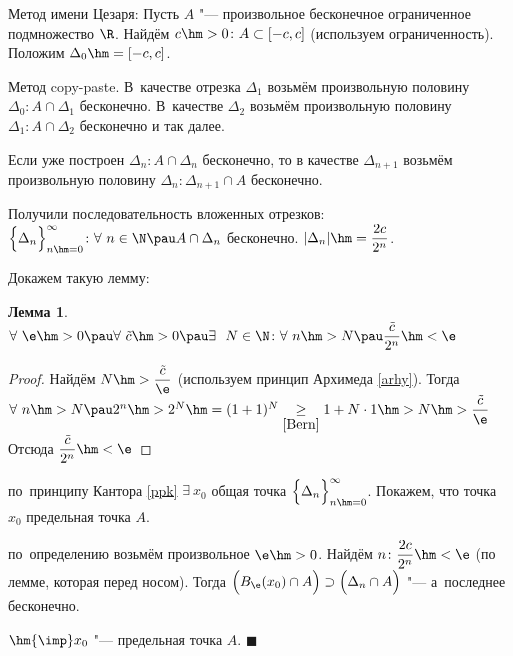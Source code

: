 \documentclass[a4paper,10pt,twoside]{article}
\newtheorem{Th}{Лемма}[section]
\newenvironment{Proof}
       {\par\noindent{\textbf{Доказательство.}}}
       {\hfill$\scriptstyle\blacksquare$}
\begin{document}
\begin{Proof}
    Метод имени Цезаря: Пусть $A$ "--- произвольное бесконечное ограниченное подмножество $\R$. Найдём $c\hm>0\colon A\subset[-c,c]$ (используем ограниченность).
    Положим $\Delta_0\hm=[-c,c]$.

    Метод copy-paste. В~качестве отрезка $\Delta_1$ возьмём произвольную половину $\Delta_0\colon A\cap \Delta_1$ бесконечно. В~качестве $\Delta_2$ возьмём произвольную половину $\Delta_1\colon A\cap\Delta_2$ бесконечно и так далее.

    Если уже построен $\Delta_n\colon A\cap \Delta_n$ бесконечно, то в
    качестве $\Delta_{n+1}$ возьмём произвольную половину $\Delta_n\colon \Delta_{n+1}\cap A$ бесконечно.

    Получили последовательность вложенных отрезков: $\Big\{\Delta_n\Big\}_{n\hm=0}^{\infty}\colon \forall\  n\in \N\pau A\cap\Delta_n$ бесконечно. $|\Delta_n|\hm=\dfrac{2c}{2^n}$.

    Докажем такую лемму:

    \begin{Th}\label{perednosom}
        $\forall\ \e\hm>0\pau \forall\  \tilde c\hm>0\pau \exists\ \ N\in\N\colon \forall\  n\hm>N\pau \dfrac{\tilde c}{2^n}\hm<\e$
    \end{Th}

    \begin{proof}
        Найдём $N\hm>\dfrac{\tilde c}{\e}$ (используем принцип Архимеда \ref{arhy}).
         Тогда $\forall\  n\hm>N\pau 2^n\hm>2^N\hm=(1+1)^N\underset{\ref{Bern}}{\geq} 1+N\cdot1\hm>N\hm>\dfrac{\tilde c}{\e}$
        Отсюда $\dfrac{\tilde c}{2^n}\hm<\e$

    \end{proof}

    по~принципу Кантора \ref{ppk} $\exists\  x_0$ общая точка $\Big\{\Delta_n\Big\}_{n\hm=0}^\infty$. Покажем, что точка $x_0$ предельная точка $A$.



    по~определению возьмём произвольное $\e\hm>0$. Найдём $n\colon \dfrac{2c}{2^n}\hm<\e$ (по лемме, которая перед носом). Тогда $\Big(B_\e(x_0)\cap A\Big)\supset\Big(\Delta_n\cap A\Big)$ "--- а~последнее бесконечно.




    $\hm{\imp} x_0$ "--- предельная точка $A$.
\end{Proof}
\end{document}
